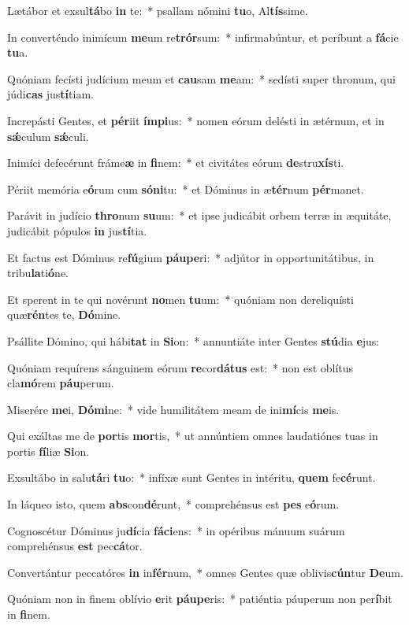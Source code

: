 \item Lætábor et exsul\textbf{tá}bo \textbf{in} te:~* psallam nómini \textbf{tu}o, Al\textbf{tís}sime.
\item In converténdo inimícum \textbf{me}um re\textbf{trór}sum:~* infirmabúntur, et períbunt a \textbf{fá}cie \textbf{tu}a.
\item Quóniam fecísti judícium meum et \textbf{cau}sam \textbf{me}am:~* sedísti super thronum, qui júdi\textbf{cas} jus\textbf{tí}tiam.
\item Increpásti Gentes, et \textbf{pér}iit \textbf{ím}\textbf{pi}us:~* nomen eórum delésti in ætérnum, et in \textbf{sǽ}culum \textbf{sǽ}culi.
\item Inimíci defecérunt fráme\textbf{æ} in \textbf{fi}nem:~* et civitátes eórum \textbf{de}stru\textbf{xís}ti.
\item Périit memória e\textbf{ó}rum cum \textbf{só}\textbf{ni}tu:~* et Dóminus in æ\textbf{tér}num \textbf{pér}manet.
\item Parávit in judício \textbf{thro}num \textbf{su}um:~* et ipse judicábit orbem terræ in æquitáte, judicábit pópulos \textbf{in} jus\textbf{tí}tia.
\item Et factus est Dóminus re\textbf{fú}gium \textbf{páu}\textbf{pe}ri:~* adjútor in opportunitátibus, in tribu\textbf{la}ti\textbf{ó}ne.
\item Et sperent in te qui novérunt \textbf{no}men \textbf{tu}um:~* quóniam non dereliquísti quæ\textbf{rén}tes te, \textbf{Dó}mine.
\item Psállite Dómino, qui hábi\textbf{tat} in \textbf{Si}on:~* annuntiáte inter Gentes \textbf{stú}dia \textbf{e}jus:
\item Quóniam requírens sánguinem eórum \textbf{re}cor\textbf{dá}\textbf{tus} est:~* non est oblítus cla\textbf{mó}rem \textbf{páu}perum.
\item Miserére \textbf{me}i, \textbf{Dó}\textbf{mi}ne:~* vide humilitátem meam de ini\textbf{mí}cis \textbf{me}is.
\item Qui exáltas me de \textbf{por}tis \textbf{mor}tis,~* ut annúntiem omnes laudatiónes tuas in portis \textbf{fí}liæ \textbf{Si}on.
\item Exsultábo in salu\textbf{tá}ri \textbf{tu}o:~* infíxæ sunt Gentes in intéritu, \textbf{quem} fe\textbf{cé}runt.
\item In láqueo isto, quem \textbf{abs}con\textbf{dé}runt,~* comprehénsus est \textbf{pes} e\textbf{ó}rum.
\item Cognoscétur Dóminus ju\textbf{dí}cia \textbf{fá}\textbf{ci}ens:~* in opéribus mánuum suárum comprehénsus \textbf{est} pec\textbf{cá}tor.
\item Convertántur peccatóres \textbf{in} in\textbf{fér}num,~* omnes Gentes quæ oblivis\textbf{cún}tur \textbf{De}um.
\item Quóniam non in finem oblívio \textbf{e}rit \textbf{páu}\textbf{pe}ris:~* patiéntia páuperum non per\textbf{í}bit in \textbf{fi}nem.
